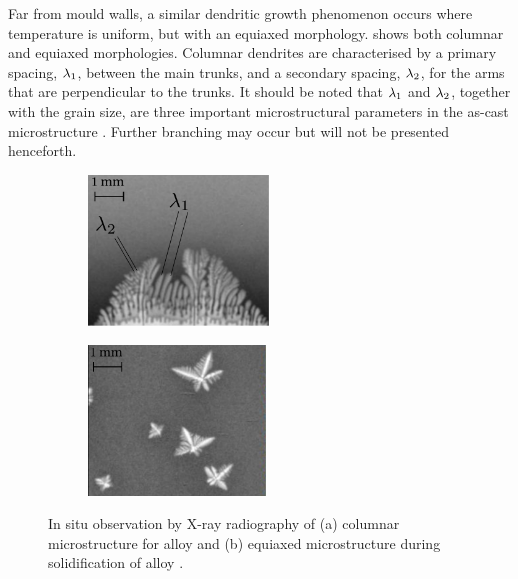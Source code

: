 Far from mould walls, a similar dendritic growth phenomenon occurs where temperature is uniform, but with an equiaxed morphology.
 shows both columnar and equiaxed morphologies. Columnar dendrites are characterised by a primary spacing, 
${\lambda}_{1}$, between the main trunks, and a secondary spacing, ${\lambda}_{2}$, for the arms that are perpendicular
to the trunks. It should be noted that ${\lambda}_{1}$ and ${\lambda}_{2}$, together with the grain size, are three important 
microstructural parameters in the as-cast microstructure \citep{easton_grain_2011}.
Further branching may occur but will not be presented henceforth.

\begin{figure}[htbp]
\centering
  \begin{subfigure}[t]{0.45\textwidth}
    \centering
	\includegraphics[height=4cm]{Chapter1/Graphics/dendrite_C.pdf}
	\caption{}
    \label{fig:dendrite_C}
  \end{subfigure}
   \begin{subfigure}[t]{0.45\textwidth}
    \centering
	\includegraphics[height=4cm]{Chapter1/Graphics/dendrite_E.pdf}
	\caption{}
    \label{fig:dendrite_E}
  \end{subfigure}
\caption{In situ observation by X-ray radiography of (a) columnar microstructure for  alloy \citep{buffet_measurement_2010}
and (b) equiaxed microstructure during solidification of  alloy \citep{bogno_growth_2013}.}
\label{fig:dendritic_growth}
\end{figure}


